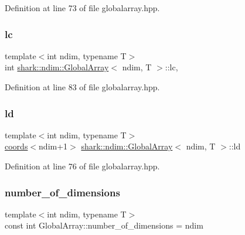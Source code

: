 Definition at line 73 of file globalarray.\+hpp.

\hypertarget{classshark_1_1ndim_1_1_global_array_a8248f4bd6e1f48d25148dd6d5288cb4c}{}\label{classshark_1_1ndim_1_1_global_array_a8248f4bd6e1f48d25148dd6d5288cb4c} 
\subsubsection{\texorpdfstring{lc}{lc}}
{\footnotesize\ttfamily template$<$int ndim, typename T$>$ \\
int \hyperlink{classshark_1_1ndim_1_1_global_array}{shark\+::ndim\+::\+Global\+Array}$<$ ndim, T $>$\+::lc\hspace{0.3cm}{\ttfamily [mutable]}, {\ttfamily [private]}}



Definition at line 83 of file globalarray.\+hpp.

\hypertarget{classshark_1_1ndim_1_1_global_array_afdc4665e0fde4a703785436af351df49}{}\label{classshark_1_1ndim_1_1_global_array_afdc4665e0fde4a703785436af351df49} 
\subsubsection{\texorpdfstring{ld}{ld}}
{\footnotesize\ttfamily template$<$int ndim, typename T$>$ \\
\hyperlink{structshark_1_1ndim_1_1coords}{coords}$<$ndim+1$>$ \hyperlink{classshark_1_1ndim_1_1_global_array}{shark\+::ndim\+::\+Global\+Array}$<$ ndim, T $>$\+::ld\hspace{0.3cm}{\ttfamily [private]}}



Definition at line 76 of file globalarray.\+hpp.

\hypertarget{classshark_1_1ndim_1_1_global_array_aa97c2cc7bef528fca0118cac8e8a5c39}{}\label{classshark_1_1ndim_1_1_global_array_aa97c2cc7bef528fca0118cac8e8a5c39} 
\subsubsection{\texorpdfstring{number\+\_\+of\+\_\+dimensions}{number\_of\_dimensions}}
{\footnotesize\ttfamily template$<$int ndim, typename T$>$ \\
const int Global\+Array\+::number\+\_\+of\+\_\+dimensions = ndim\hspace{0.3cm}{\ttfamily [static]}}



